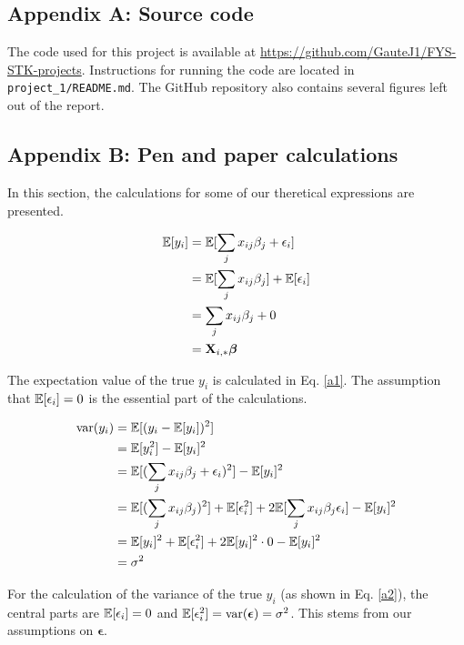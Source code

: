 \subsection{Appendix A: Source code} \label{appendixA}
The code used for this project is available at \url{https://github.com/GauteJ1/FYS-STK-projects}. Instructions for running the code are located in \texttt{ project\_1/README.md}. The GitHub repository also contains several figures left out of the report. 

\subsection{Appendix B: Pen and paper calculations}\label{appendixB}

In this section, the calculations for some of our theretical expressions are presented. 

\begin{align}\label{a1}
    \mathbb{E}[y_i] & = \mathbb{E}[\sum_j x_{ij}\beta_j + \epsilon_i] \nonumber \\
    & = \mathbb{E}[\sum_j x_{ij}\beta_j] + \mathbb{E}[\epsilon_i] \nonumber \\ 
    & = \sum_j x_{ij}\beta_j + 0 \nonumber \\
    & = \mathbf{X}_{i,*}\boldsymbol{\beta}
\end{align}

The expectation value of the true $y_i$ is calculated in Eq. \ref{a1}. The assumption that $\mathbb{E}[\epsilon_i] = 0$ is the essential part of the calculations. 



\begin{align}\label{a2}
    \text{var}(y_i) & = \mathbb{E}[(y_i -\mathbb{E}[y_i])^2] \nonumber \\
    & = \mathbb{E}[y_i^2] - \mathbb{E}[y_i]^2 \nonumber \\ 
    & = \mathbb{E}[(\sum_j x_{ij}\beta_j + \epsilon_i)^2] - \mathbb{E}[y_i]^2 \nonumber \\
    & = \mathbb{E}[(\sum_j x_{ij}\beta_j)^2] + \mathbb{E}[\epsilon_i^2] + 2\mathbb{E}[\sum_j x_{ij}\beta_j \epsilon_i ] - \mathbb{E}[y_i]^2 \nonumber \\
    & = \mathbb{E}[y_i]^2 + \mathbb{E}[\epsilon_i^2] + 2\mathbb{E}[y_i]^2\cdot 0 - \mathbb{E}[y_i]^2 \nonumber \\ 
    & = \sigma^2
\end{align}

For the calculation of the variance of the true $y_i$ (as shown in Eq. \ref{a2}), the central parts are $\mathbb{E}[\epsilon_i] = 0$ and $\mathbb{E}[\epsilon_i^2] = \text{var}(\boldsymbol{\epsilon}) = \sigma^2$. This stems from our assumptions on $\boldsymbol{\epsilon}$. 

